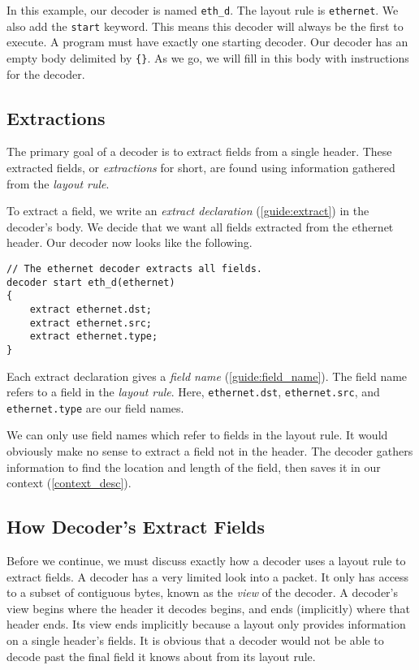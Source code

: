 In this example, our decoder is named \texttt{eth\_d}. The layout rule is \texttt{ethernet}. We also add the \texttt{start} keyword. This means this decoder will always be the first to execute. A program must have exactly one starting decoder. Our decoder has an empty body delimited by \texttt{\{\}}. As we go, we will fill in this body with instructions for the decoder.

\subsection{Extractions} \label{tut:decoder_extract}

The primary goal of a decoder is to extract fields from a single header. These extracted fields, or \textit{extractions} for short, are found using information gathered from the \textit{layout rule}.

To extract a field, we write an \textit{extract declaration} (\ref{guide:extract}) in the decoder's body. We decide that we want all fields extracted from the ethernet header. Our decoder now looks like the following.

\begin{codepage}
\begin{lstlisting}
// The ethernet decoder extracts all fields.
decoder start eth_d(ethernet) 
{
	extract ethernet.dst; 
	extract ethernet.src;
	extract ethernet.type; 
}
\end{lstlisting}
\end{codepage}

Each extract declaration gives a \textit{field name} (\ref{guide:field_name}). The field name refers to a field in the \textit{layout rule}. Here, \texttt{ethernet.dst}, \texttt{ethernet.src}, and \texttt{ethernet.type} are our field names.

We can only use field names which refer to fields in the layout rule. It would obviously make no sense to extract a field not in the header. The decoder gathers information to find the location and length of the field, then saves it in our context (\ref{context_desc}).

\subsection{How Decoder's Extract Fields} \label{tut:extract_how}

Before we continue, we must discuss exactly how a decoder uses a layout rule to extract fields. A decoder has a very limited look into a packet. It only has access to a subset of contiguous bytes, known as the \textit{view} of the decoder. A decoder's view begins where the header it decodes begins, and ends (implicitly) where that header ends. Its view ends implicitly because a layout only provides information on a single header's fields. It is obvious that a decoder would not be able to decode past the final field it knows about from its layout rule.

